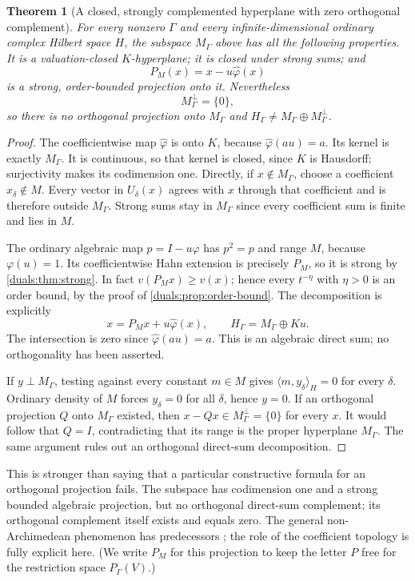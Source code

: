 \documentclass[11pt,letterpaper]{article}
\numberwithin{equation}{section}
\newtheorem{theorem}{Theorem}[section]
\theoremstyle{definition}
\theoremstyle{remark}
\newcommand{\ip}[2]{\langle#1,#2\rangle}
\begin{document}
\begin{theorem}[A closed, strongly complemented hyperplane with zero
orthogonal complement]\label{duals:thm:hyperplane}
For every nonzero $\Gamma$ and every infinite-dimensional ordinary
complex Hilbert space $H$, the subspace $M_\Gamma$ above has all the
following properties. It is a valuation-closed $K$-hyperplane; it is
closed under strong sums; and
\[
 P_M(x)=x-u\widehat\varphi(x)
\]
is a strong, order-bounded projection onto it. Nevertheless
\[
 M_\Gamma^\perp=\{0\},
\]
so there is no orthogonal projection onto $M_\Gamma$ and
$H_\Gamma\ne M_\Gamma\oplus M_\Gamma^\perp$.
\end{theorem}
\begin{proof}
The coefficientwise map $\widehat\varphi$ is onto $K$, because
$\widehat\varphi(au)=a$. Its kernel is exactly $M_\Gamma$.
It is continuous, so that kernel is closed, since $K$ is Hausdorff;
surjectivity makes its codimension one. Directly, if
$x\notin M_\Gamma$, choose a coefficient $x_\delta\notin M$.
Every vector in $U_\delta(x)$ agrees with $x$ through that
coefficient and is therefore outside $M_\Gamma$.
Strong sums stay in $M_\Gamma$ since every coefficient sum is finite
and lies in $M$.

The ordinary algebraic map $p=I-u\varphi$ has $p^2=p$ and range $M$,
because $\varphi(u)=1$. Its coefficientwise Hahn extension is
precisely $P_M$, so it is strong by \cref{duals:thm:strong}. In fact
$v(P_Mx)\ge v(x)$; hence every $t^{-\eta}$ with $\eta>0$ is an
order bound, by the proof of \cref{duals:prop:order-bound}.
The decomposition is explicitly
\[
 x=P_Mx+u\widehat\varphi(x),\qquad
 H_\Gamma=M_\Gamma\oplus Ku.
\]
The intersection is zero since
$\widehat\varphi(au)=a$. This is an algebraic direct sum; no
orthogonality has been asserted.

If $y\perp M_\Gamma$, testing against every constant $m\in M$
gives $\ip{m}{y_\delta}_H=0$ for every $\delta$.
Ordinary density of $M$ forces $y_\delta=0$ for all $\delta$, hence
$y=0$. If an orthogonal projection $Q$ onto $M_\Gamma$ existed,
then $x-Qx\in M_\Gamma^\perp=\{0\}$ for every $x$.
It would follow that $Q=I$, contradicting that its range is the proper
hyperplane $M_\Gamma$. The same argument rules out an orthogonal
direct-sum decomposition.
\end{proof}

This is stronger than saying that a particular constructive formula for
an orthogonal projection fails. The subspace has codimension one and a
strong bounded algebraic projection, but no orthogonal direct-sum
complement; its orthogonal complement itself exists and equals zero. The general non-Archimedean phenomenon has predecessors
\cite{AN}; the role of the coefficient topology is fully explicit here.
(We write $P_M$ for this projection to keep the letter $P$ free for the
restriction space $P_\Gamma(V)$.)
\end{document}
